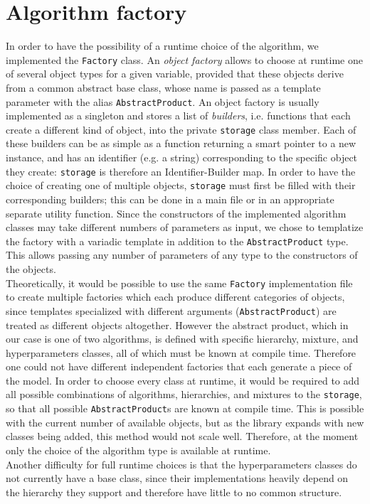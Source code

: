 \section{Algorithm factory}
In order to have the possibility of a runtime choice of the algorithm, we implemented the \verb|Factory| class.
An \emph{object factory} allows to choose at runtime one of several object types for a given variable, provided that these objects derive from a common abstract base class, whose name is passed as a template parameter with the alias \verb|AbstractProduct|.
An object factory is usually implemented as a singleton and stores a list of \emph{builders}, i.e. functions that each create a different kind of object, into the private \verb|storage| class member.
Each of these builders can be as simple as a function returning a smart pointer to a new instance, and has an identifier (e.g. a string) corresponding to the specific object they create: \verb|storage| is therefore an Identifier-Builder map.
In order to have the choice of creating one of multiple objects, \verb|storage| must first be filled with their corresponding builders; this can be done in a main file or in an appropriate separate utility function.
Since the constructors of the implemented algorithm classes may take different numbers of parameters as input, we chose to templatize the factory with a variadic template in addition to the \verb|AbstractProduct| type.
This allows passing any number of parameters of any type to the constructors of the objects. \\
Theoretically, it would be possible to use the same \verb|Factory| implementation file to create multiple factories which each produce different categories of objects, since templates specialized with different arguments (\verb|AbstractProduct|) are treated as different objects altogether.
However the abstract product, which in our case is one of two algorithms, is defined with specific hierarchy, mixture, and hyperparameters classes, all of which must be known at compile time.
Therefore one could not have different independent factories that each generate a piece of the model.
In order to choose every class at runtime, it would be required to add all possible combinations of algorithms, hierarchies, and mixtures to the \verb|storage|, so that all possible \verb|AbstractProduct|s are known at compile time.
This is possible with the current number of available objects, but as the library expands with new classes being added, this method would not scale well.
Therefore, at the moment only the choice of the algorithm type is available at runtime. \\
Another difficulty for full runtime choices is that the hyperparameters classes do not currently have a base class, since their implementations heavily depend on the hierarchy they support and therefore have little to no common structure.
